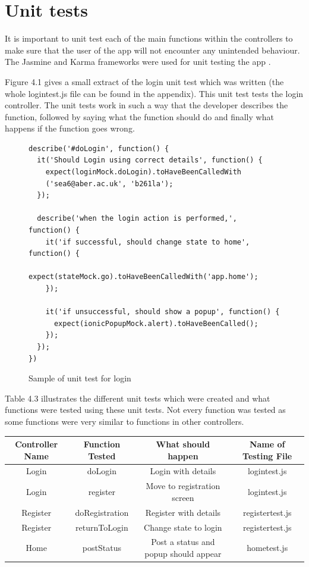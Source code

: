 \section{Unit tests}
It is important to unit test each of the main functions within the controllers to make sure that the user of the app will not encounter any unintended behaviour. The Jasmine and Karma frameworks were used for unit testing the app \cite{testing}.

Figure 4.1 gives a small extract of the login unit test which was written (the whole logintest.js file can be found in the appendix). This unit test tests the login controller. The unit tests work in such a way that the developer describes the function, followed by saying what the function should do and finally what happens if the function goes wrong. 

\begin{figure}[H]

\begin{verbatim}
describe('#doLogin', function() {
  it('Should Login using correct details', function() {
    expect(loginMock.doLogin).toHaveBeenCalledWith
    ('sea6@aber.ac.uk', 'b261la'); 
  });

  describe('when the login action is performed,', function() {
    it('if successful, should change state to home', function() {
      expect(stateMock.go).toHaveBeenCalledWith('app.home');
    });

    it('if unsuccessful, should show a popup', function() {
      expect(ionicPopupMock.alert).toHaveBeenCalled();
    });
  });
})
\end{verbatim}
\caption{Sample of unit test for login}
\end{figure}

Table 4.3 illustrates the different unit tests which were created and what functions were tested using these unit tests. Not every function was tested as some functions were very similar to functions in other controllers.

\begin{tabular} {||c c c c||}  
\hline
 Controller Name & Function Tested & What should happen & Name of Testing File\\
 \hline
 \hline 
 Login & doLogin & Login with details & logintest.js \\
 \hline
 Login & register &Move to registration screen & logintest.js \\
 \hline
 Register & doRegistration & Register with details & registertest.js \\
 \hline
 Register & returnToLogin & Change state to login & registertest.js \\
 \hline
 Home & postStatus & Post a status and popup should appear & hometest.js \\
 \hline
 \end{tabular}


